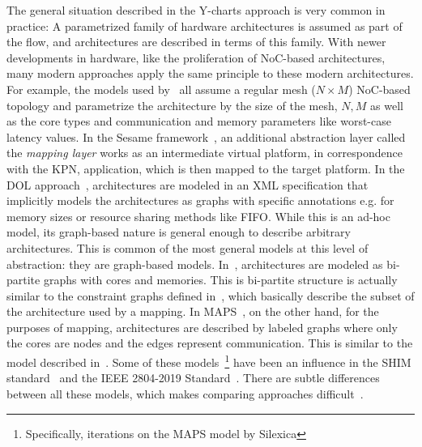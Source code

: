 The general situation described in the Y-charts approach is very common in practice: A parametrized family of hardware architectures is assumed as part of the flow, and architectures are described in terms of this family.
With newer developments in hardware, like the proliferation of \ac{NoC}-based architectures, many modern approaches apply the same principle to these modern architectures.
For example, the models used by~\cite{weichslgartner2014daarm,singh2010communication,richthammer2018search} all assume a regular mesh ($N \times M$) \ac{NoC}-based topology and parametrize the architecture by the size of the mesh, $N,M$ as well as the core types and communication and memory parameters like worst-case latency values.
In the Sesame framework~\cite{pimentel2006systematic}, an additional abstraction layer called the \emph{mapping layer} works as an intermediate virtual platform, in correspondence with the \ac{KPN}, application, which is then mapped to the target platform.
In the DOL approach~\cite{thiele2007DOL}, architectures are modeled in an XML specification that implicitly models the architectures as graphs with specific annotations e.g. for memory sizes or resource sharing methods like \ac{FIFO}. 
While this is an ad-hoc model, its graph-based nature is general enough to describe arbitrary architectures.
This is common of the most general models at this level of abstraction: they are graph-based models.
In~\cite{erbas2006multiobjective}, architectures are modeled as bi-partite graphs with cores and memories.
This is bi-partite structure is actually similar to the constraint graphs defined in~\cite{weichslgartner2014daarm,richthammer2018search}, which basically describe the subset of the architecture used by a mapping. 
In \ac{MAPS}~\cite{maps}, on the other hand, for the purposes of mapping, architectures are described by labeled graphs where only the cores are nodes and the edges represent communication.
This is similar to the model described in~\cite{pimentel2006systematic}.
Some of these models~\footnote{Specifically, iterations on the \ac{MAPS} model by Silexica} have been an influence in the SHIM standard~\cite{mca_shim15} and the IEEE 2804-2019 Standard~\cite{ieee-2804-2019}.
There are subtle differences between all these models, which makes comparing approaches difficult~\cite{goens_mcsoc16}.

